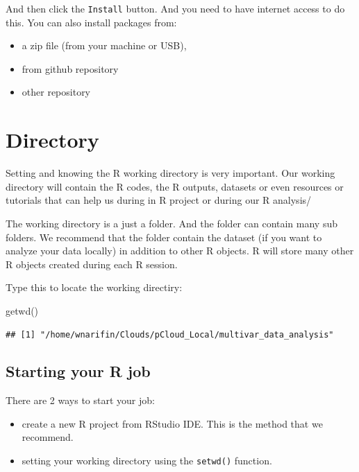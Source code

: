 \documentclass[
  10pt,
]{krantz}
\newenvironment{Shaded}{\begin{snugshade}}{\end{snugshade}}
\newcommand{\FunctionTok}[1]{\textcolor[rgb]{0.00,0.00,0.00}{#1}}
\newcommand{\NormalTok}[1]{#1}
\providecommand{\tightlist}{%
  \setlength{\itemsep}{0pt}\setlength{\parskip}{0pt}}
\begin{document}
And then click the \texttt{Install} button. And you need to have internet access to do this. You can also install packages from:

\begin{itemize}
\tightlist
\item
  a zip file (from your machine or USB),
\item
  from github repository
\item
  other repository
\end{itemize}

\hypertarget{directory}{%
\section{Directory}\label{directory}}

Setting and knowing the R working directory is very important. Our working directory will contain the R codes, the R outputs, datasets or even resources or tutorials that can help us during in R project or during our R analysis/

The working directory is a just a folder. And the folder can contain many sub folders. We recommend that the folder contain the dataset (if you want to analyze your data locally) in addition to other R objects. R will store many other R objects created during each R session.

Type this to locate the working directiry:

\begin{Shaded}
\begin{Highlighting}[]
\FunctionTok{getwd}\NormalTok{()}
\end{Highlighting}
\end{Shaded}

\begin{verbatim}
## [1] "/home/wnarifin/Clouds/pCloud_Local/multivar_data_analysis"
\end{verbatim}

\hypertarget{starting-your-r-job}{%
\subsection{Starting your R job}\label{starting-your-r-job}}

There are 2 ways to start your job:

\begin{itemize}
\tightlist
\item
  create a new R project from RStudio IDE. This is the method that we recommend.
\item
  setting your working directory using the \texttt{setwd()} function.
\end{itemize}
\end{document}
